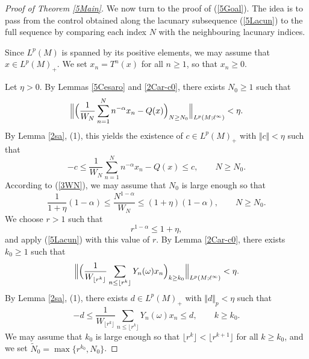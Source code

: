 \documentclass[12pt]{amsart}
\newcommand{\norm}[1]{\Vert#1\Vert}
\theoremstyle{remark}
\theoremstyle{definition}
\numberwithin{equation}{section}
\begin{document}
\begin{proof}[Proof of Theorem \ref{5Main}]
We now turn to the proof of (\ref{5Goal}). The idea is to pass from the control obtained along the lacunary subsequence (\ref{5Lacun}) to the full sequence by comparing each index $N$ with the neighbouring lacunary indices.

Since $L^p(M)$ is spanned by its positive elements, we may assume that $x\in L^p(M)_+$. We set $x_n =T^n(x)$ for all $n\geq 1$, so that $x_n\geq 0$.

Let $\eta>0$. By Lemmas \ref{5Cesaro} and \ref{2Car-c0}, there exists $N_0\geq 1$ such that
\[
\Big\|\Bigl(\frac{1}{W_N}\sum_{n=1}^N n^{-\alpha}x_n -Q(x)\Bigr)_{N\geq N_0}\Big\|_{L^p(M;\ell^\infty)}<\eta.
\]
By Lemma \ref{2sa}, (1), this yields the existence of $c\in L^p(M)_+$ with $\norm{c}<\eta$ such that
\[
-c\leq \frac{1}{W_N}\sum_{n=1}^N n^{-\alpha}x_n -Q(x) \leq c,\qquad N\geq N_0.
\]
According to (\ref{3WN}), we may assume that $N_0$ is large enough so that
\begin{equation}\label{Eps1}
\frac{1}{1+\eta}(1-\alpha)\leq \frac{N^{1-\alpha}}{W_N}\leq (1+\eta)(1-\alpha),\qquad N\geq N_0.
\end{equation}
We choose $r>1$ such that
\begin{equation}\label{Eps2}
r^{1-\alpha}\leq 1+\eta,
\end{equation}
and apply (\ref{5Lacun}) with this value of $r$. By Lemma \ref{2Car-c0}, there exists $k_0\geq 1$ such that
\[
\Big\|\Bigl(\frac{1}{W_{\lfloor r^k \rfloor}}
\sum_{n\leq \lfloor r^k \rfloor} Y_n(\omega)x_n\Bigr)_{k\geq k_0}\Big\|_{L^p(M;\ell^\infty)}<\eta.
\]
By Lemma \ref{2sa}, (1), there exists $d\in L^p(M)_+$ with $\norm{d}_p<\eta$ such that
\[
-d\leq \frac{1}{W_{\lfloor r^k \rfloor}}
\sum_{n\leq \lfloor r^k \rfloor} Y_n(\omega)x_n \leq d,\qquad k\geq k_0.
\]
We may assume that $k_0$ is large enough so that $\lfloor r^k \rfloor<\lfloor r^{k+1} \rfloor$ for all $k\geq k_0$, and we set $\widetilde{N}_0=\max\{r^{k_0},N_0\}$.


\end{proof}
\end{document}
